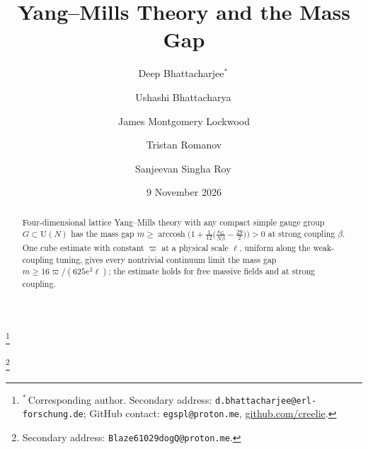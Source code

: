 \documentclass[aps,prd,twocolumn,superscriptaddress,nofootinbib,longbibliography,floatfix,amsmath,amssymb,10pt]{revtex4-2}
\theoremstyle{definition}
\theoremstyle{remark}
\newcommand{\U}{\mathrm{U}}
\begin{document}

\title{Yang--Mills Theory and the Mass Gap}

\author{Deep Bhattacharjee$^{*}$\,}
\thanks{$^{*}$\,Corresponding author. Secondary address:
\nolinkurl{d.bhattacharjee@erl-forschung.de}; GitHub contact:
\nolinkurl{egspl@proton.me}, \href{https://github.com/creelie}{github.com/creelie}.}



\author{Ushashi Bhattacharya\,}

\author{James Montgomery Lockwood}
\thanks{Secondary address: \nolinkurl{Blaze61029dogQ@proton.me}.}

\author{Tristan Romanov}

\author{Sanjeevan Singha Roy\,}

\date{9 November 2026}

\begin{abstract}
Four-dimensional lattice Yang--Mills theory with any compact simple gauge group $G\subset\U(N)$ has the mass gap $m\ge\operatorname{arccosh}\bigl(1+\frac1{12}\bigl(\frac{\kappa_G}{N\beta}-\frac{29}2\bigr)\bigr)>0$ at strong coupling $\beta$. One cube estimate with constant $\varpi$ at a physical scale $\ell$, uniform along the weak-coupling tuning, gives every nontrivial continuum limit the mass gap $m\ge16\varpi/(625e^2\ell)$; the estimate holds for free massive fields and at strong coupling.
\end{abstract}

\maketitle
\end{document}
